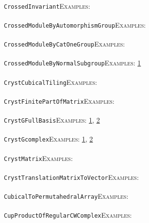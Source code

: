 \documentclass[a4paper,11pt]{report}
\begin{document}
{{ \\
 \texttt{CrossedInvariant}{\nobreakspace}{\nobreakspace}{\nobreakspace}{\nobreakspace}\textsc{Examples:} \\
 \\
 \texttt{CrossedModuleByAutomorphismGroup}{\nobreakspace}{\nobreakspace}{\nobreakspace}{\nobreakspace}\textsc{Examples:} \\
 \\
 \texttt{CrossedModuleByCatOneGroup}{\nobreakspace}{\nobreakspace}{\nobreakspace}{\nobreakspace}\textsc{Examples:} \\
 \\
 \texttt{CrossedModuleByNormalSubgroup}{\nobreakspace}{\nobreakspace}{\nobreakspace}{\nobreakspace}\textsc{Examples:} \href{../www/SideLinks/About/aboutNonabelian.html} {1}{\nobreakspace} \\
 \\
 \texttt{CrystCubicalTiling}{\nobreakspace}{\nobreakspace}{\nobreakspace}{\nobreakspace}\textsc{Examples:} \\
 \\
 \texttt{CrystFinitePartOfMatrix}{\nobreakspace}{\nobreakspace}{\nobreakspace}{\nobreakspace}\textsc{Examples:} \\
 \\
 \texttt{CrystGFullBasis}{\nobreakspace}{\nobreakspace}{\nobreakspace}{\nobreakspace}\textsc{Examples:} \href{tutorial/chap8.html} {1}{\nobreakspace}, \href{../www/SideLinks/About/aboutBredon.html} {2}{\nobreakspace} \\
 \\
 \texttt{CrystGcomplex}{\nobreakspace}{\nobreakspace}{\nobreakspace}{\nobreakspace}\textsc{Examples:} \href{tutorial/chap8.html} {1}{\nobreakspace}, \href{../www/SideLinks/About/aboutBredon.html} {2}{\nobreakspace} \\
 \\
 \texttt{CrystMatrix}{\nobreakspace}{\nobreakspace}{\nobreakspace}{\nobreakspace}\textsc{Examples:} \\
 \\
 \texttt{CrystTranslationMatrixToVector}{\nobreakspace}{\nobreakspace}{\nobreakspace}{\nobreakspace}\textsc{Examples:} \\
 \\
 \texttt{CubicalToPermutahedralArray}{\nobreakspace}{\nobreakspace}{\nobreakspace}{\nobreakspace}\textsc{Examples:} \\
 \\
 \texttt{CupProductOfRegularCWComplex}{\nobreakspace}{\nobreakspace}{\nobreakspace}{\nobreakspace}\textsc{Examples:} \\
}}
\end{document}
